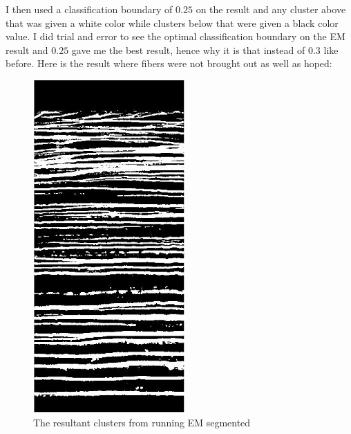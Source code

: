 \documentclass[11pt,psfig]{article}
\begin{document}
I then used a classification boundary of $0.25$ on the result and any cluster above that was given a white color while clusters below that were given a black color value. I did trial and error to see the optimal classification boundary on the EM result and $0.25$ gave me the best result, hence why it is that instead of $0.3$ like before. Here is the result where fibers were not brought out as well as hoped:
\begin{figure}[H]
\centering
\includegraphics[height=5in]{emResultSegmented.jpg}
\caption{The resultant clusters from running EM segmented}
\end{figure}
\end{document}
